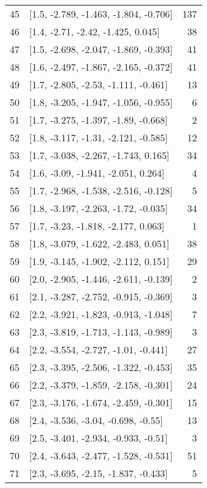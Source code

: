 \documentclass{article}%
\begin{document}
\begin{longtable}{llr}
45  &  [1.5, -2.789, -1.463, -1.804, -0.706] &     137 \\
46  &     [1.4, -2.71, -2.42, -1.425, 0.045] &      38 \\
47  &  [1.5, -2.698, -2.047, -1.869, -0.393] &      41 \\
48  &  [1.6, -2.497, -1.867, -2.165, -0.372] &      41 \\
49  &   [1.7, -2.805, -2.53, -1.111, -0.461] &      13 \\
50  &  [1.8, -3.205, -1.947, -1.056, -0.955] &       6 \\
51  &   [1.7, -3.275, -1.397, -1.89, -0.668] &       2 \\
52  &   [1.8, -3.117, -1.31, -2.121, -0.585] &      12 \\
53  &   [1.7, -3.038, -2.267, -1.743, 0.165] &      34 \\
54  &    [1.6, -3.09, -1.941, -2.051, 0.264] &       4 \\
55  &  [1.7, -2.968, -1.538, -2.516, -0.128] &       5 \\
56  &   [1.8, -3.197, -2.263, -1.72, -0.035] &      34 \\
57  &    [1.7, -3.23, -1.818, -2.177, 0.063] &       1 \\
58  &   [1.8, -3.079, -1.622, -2.483, 0.051] &      38 \\
59  &   [1.9, -3.145, -1.902, -2.112, 0.151] &      29 \\
60  &  [2.0, -2.905, -1.446, -2.611, -0.139] &       2 \\
61  &  [2.1, -3.287, -2.752, -0.915, -0.369] &       3 \\
62  &  [2.2, -3.921, -1.823, -0.913, -1.048] &       7 \\
63  &  [2.3, -3.819, -1.713, -1.143, -0.989] &       3 \\
64  &   [2.2, -3.554, -2.727, -1.01, -0.441] &      27 \\
65  &  [2.3, -3.395, -2.506, -1.322, -0.453] &      35 \\
66  &  [2.2, -3.379, -1.859, -2.158, -0.301] &      24 \\
67  &  [2.3, -3.176, -1.674, -2.459, -0.301] &      15 \\
68  &    [2.4, -3.536, -3.04, -0.698, -0.55] &      13 \\
69  &   [2.5, -3.401, -2.934, -0.933, -0.51] &       3 \\
70  &  [2.4, -3.643, -2.477, -1.528, -0.531] &      51 \\
71  &   [2.3, -3.695, -2.15, -1.837, -0.433] &       5 \\

\end{longtable}
\end{document}
